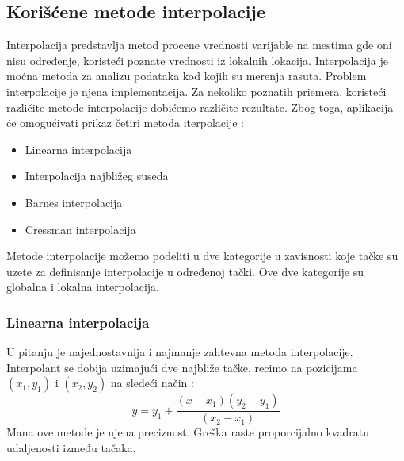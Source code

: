 \documentclass[12pt]{article}
\begin{document}
\subsection{Korišćene metode interpolacije}
Interpolacija predstavlja metod procene vrednosti varijable na mestima gde oni nisu određenje, koristeći poznate vrednosti iz lokalnih lokacija. Interpolacija je moćna metoda za analizu podataka kod kojih su merenja rasuta. Problem interpolacije je njena implementacija. Za nekoliko poznatih priemera, koristeći različite metode interpolacije dobićemo različite rezultate. Zbog toga, aplikacija će omogućivati prikaz četiri metoda iterpolacije :
\begin{itemize}
\item Linearna interpolacija
\item Interpolacija najbližeg suseda
\item Barnes interpolacija
\item Cressman interpolacija
\end{itemize}
Metode interpolacije možemo podeliti u dve kategorije u zavisnosti koje tačke su uzete za definisanje interpolacije u određenoj tački. Ove dve kategorije su globalna i lokalna interpolacija.
\subsubsection{Linearna interpolacija}
U pitanju je najednostavnija i najmanje zahtevna metoda interpolacije. Interpolant se dobija uzimajući dve najbliže tačke, recimo na pozicijama $(x_{1},y_{1})$ i $(x_{2},y_{2})$ na sledeći način : 
\begin{equation}\label{key}
y= y_{1}+ \frac{(x-x_{1})(y_{2}-y_{1})}{(x_{2}-x_{1})}
\end{equation}
Mana ove metode je njena preciznost. Greška raste proporcijalno kvadratu udaljenosti između tačaka.
\end{document}
